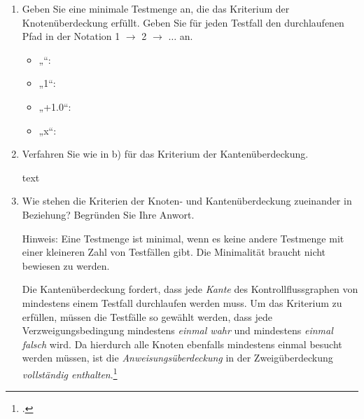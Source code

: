 \documentclass{bschlangaul-aufgabe}
\begin{document}
\begin{enumerate}

\item Geben Sie eine minimale Testmenge an, die das Kriterium der
Knotenüberdeckung erfüllt. Geben Sie für jeden Testfall den
durchlaufenen Pfad in der Notation 1 $\rightarrow$ 2 $\rightarrow$
$\dots$ an.

\begin{bAntwort}
\begin{itemize}
\item „“: \\

\item „1“:\\

\item „+1.0“:\\

\item „x“:\\
\end{itemize}
\end{bAntwort}


\item Verfahren Sie wie in b) für das Kriterium der Kantenüberdeckung.

\begin{bAntwort}
text
\end{bAntwort}


\item Wie stehen die Kriterien der Knoten- und Kantenüberdeckung
zueinander in Beziehung? Begründen Sie Ihre Anwort.

Hinweis: Eine Testmenge ist minimal, wenn es keine andere Testmenge mit
einer kleineren Zahl von Testfällen gibt. Die Minimalität braucht nicht
bewiesen zu werden.

\begin{bAntwort}
Die Kantenüberdeckung fordert, dass jede \emph{Kante} des
Kontrollflussgraphen von mindestens einem Testfall durchlaufen werden
muss. Um das Kriterium zu erfüllen, müssen die Testfälle so gewählt
werden, dass jede Verzweigungsbedingung mindestens \emph{einmal wahr}
und mindestens \emph{einmal falsch} wird. Da hierdurch alle Knoten
ebenfalls mindestens einmal besucht werden müssen, ist die
\emph{Anweisungsüberdeckung} in der Zweigüberdeckung \emph{vollständig
enthalten}.\footcite[Seite 209]{hoffmann:software}
\end{bAntwort}

\end{enumerate}
\end{document}
